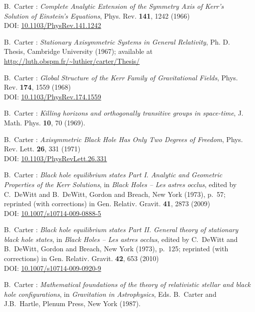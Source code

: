 \begin{thebibliography}{123}
B.~Carter :
{\em Complete Analytic Extension of the Symmetry Axis of Kerr's Solution of Einstein's Equations},
Phys. Rev. {\bf 141}, 1242 (1966)\\
DOI: \href{http://dx.doi.org/10.1103/PhysRev.141.1242}{10.1103/PhysRev.141.1242}

B.~Carter : {\em Stationary Axisymmetric Systems in General Relativity},
Ph. D. Thesis, Cambridge University (1967); available at\\
\url{http://luth.obspm.fr/~luthier/carter/Thesis/}

B.~Carter :
{\em Global Structure of the Kerr Family of Gravitational Fields},
Phys. Rev. {\bf 174}, 1559 (1968)\\
DOI: \href{http://dx.doi.org/10.1103/PhysRev.174.1559}{10.1103/PhysRev.174.1559}

B.~Carter : {\em Killing horizons and orthogonally transitive groups
in space-time},
J. Math. Phys. {\bf 10}, 70 (1969).

B.~Carter : {\em Axisymmetric Black Hole Has Only Two Degrees of Freedom},
Phys. Rev. Lett. {\bf 26}, 331 (1971)\\
DOI: \href{http://dx.doi.org/10.1103/PhysRevLett.26.331}{10.1103/PhysRevLett.26.331}

B.~Carter : {\em Black hole equilibrium states Part I.
Analytic and Geometric Properties of the Kerr Solutions},
in {\em Black Holes -- Les astres occlus},  edited by C.~DeWitt and B.~DeWitt,
Gordon and Breach, New York (1973), p.~57; reprinted (with corrections) in
Gen. Relativ. Gravit. {\bf 41}, 2873 (2009)\\
DOI: \href{http://dx.doi.org/doi:10.1007/s10714-009-0888-5}{10.1007/s10714-009-0888-5}

B.~Carter : {\em Black hole equilibrium states Part II. General theory of stationary black hole states}, in {\em Black Holes -- Les astres occlus},  edited by C.~DeWitt and B.~DeWitt,
Gordon and Breach, New York (1973), p.~125; reprinted (with corrections) in
Gen. Relativ. Gravit. {\bf 42}, 653 (2010)\\
DOI: \href{http://dx.doi.org/doi:10.1007/s10714-009-0920-9}{10.1007/s10714-009-0920-9}

B.~Carter : {\em Mathematical foundations of the theory of
relativistic stellar and black hole configurations},
in {\em Gravitation in Astrophysics}, Eds. B.~Carter and J.B.~Hartle,
Plenum Press, New York (1987).


\end{thebibliography}
